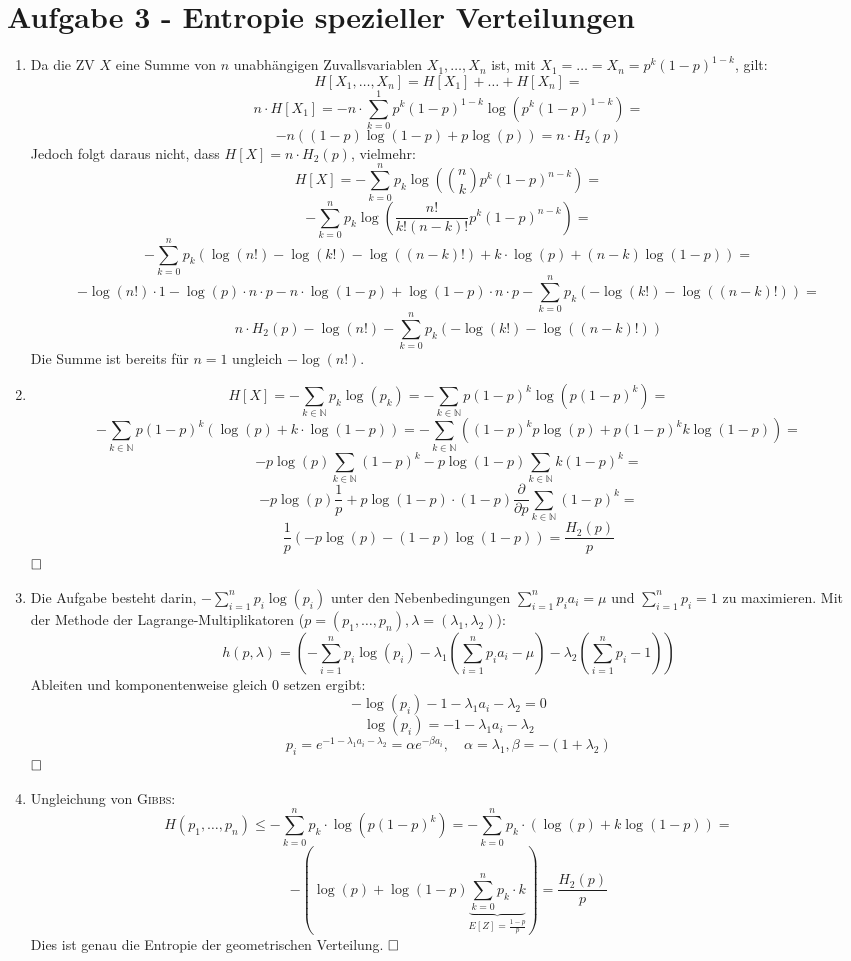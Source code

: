 \section*{Aufgabe 3 - Entropie spezieller Verteilungen}
\begin{enumerate}
	\item
		Da die ZV $X$ eine Summe von $n$ unabhängigen Zuvallsvariablen
		$X_1, \dots, X_n$ ist, mit $X_1 = \dots = X_n = p^k(1-p)^{1-k}$, gilt:
		\[ H[X_1, \dots, X_n] = H[X_1] + \dots + H[X_n] =  \] 
		\[ n \cdot H[X_1] = - n \cdot \sum_{k=0}^1 p^k(1-p)^{1-k} \log(p^k(1-p)^{1-k}) = \]
		\[ - n ((1-p) \log(1-p) + p \log(p)) = n \cdot H_2(p) \]
		Jedoch folgt daraus nicht, dass $H[X] = n \cdot H_2(p)$, vielmehr:
		\[ H[X] = -\sum_{k=0}^n p_k \log(\binom{n}{k} p^k (1-p)^{n-k}) = \]
		\[ -\sum_{k=0}^n p_k \log(\frac{n!}{k!(n-k)!} p^k (1-p)^{n-k}) = \]
		\[ -\sum_{k=0}^n p_k (\log(n!) - \log(k!) - \log((n-k)!) + k \cdot \log(p) + (n-k) \log(1-p)) = \]
		\[ -\log(n!) \cdot 1 -\log(p) \cdot n \cdot p - n \cdot \log(1-p) +
		   \log(1-p) \cdot n \cdot p -\sum_{k=0}^n p_k (-\log(k!) - \log((n-k)!)) = \]
		\[ n\cdot H_2(p) - \log(n!) - \sum_{k=0}^n p_k (-\log(k!) - \log((n-k)!)) \]
		Die Summe ist bereits für $n = 1$ ungleich $-\log(n!)$.
	\item
		\[ H[X] = -\sum_{k\in\mathds{N}} p_k \log(p_k) = -\sum_{k\in\mathds{N}} p(1-p)^k \log(p(1-p)^k) = \]
		\[ -\sum_{k\in\mathds{N}} p(1-p)^k(\log(p) + k \cdot \log(1-p))
		   = -\sum_{k\in\mathds{N}} ((1-p)^kp\log(p) + p(1-p)^kk\log(1-p)) = \]
		\[ -p\log(p)\sum_{k\in\mathds{N}}(1-p)^k - p\log(1-p)\sum_{k\in\mathds{N}}k(1-p)^k = \]
		\[ -p\log(p)\frac{1}{p} + p\log(1-p)\cdot(1-p)\frac{\partial}{\partial p}\sum_{k\in\mathds{N}}(1-p)^k = \]
		\[ \frac{1}{p}(-p\log(p)-(1-p)\log(1-p)) = \frac{H_2(p)}{p} \] $\hfill \square$
	\item
		Die Aufgabe besteht darin, $-\sum_{i=1}^n p_i \log(p_i)$ unter
		den Nebenbedingungen $\sum_{i=1}^n p_i a_i = \mu$ und $\sum_{i=1}^n p_i = 1$ zu
		maximieren. Mit der Methode der Lagrange-Multiplikatoren ($p =
		(p_1, \dots, p_n), \lambda = (\lambda_1, \lambda_2)$):
		\[ h(p, \lambda) = (-\sum_{i=1}^n p_i \log(p_i) - \lambda_1
		   (\sum_{i=1}^n p_i a_i - \mu) - \lambda_2 (\sum_{i=1}^n p_i - 1)) \]
		Ableiten und komponentenweise gleich $0$ setzen ergibt:
		\[ -\log(p_i) - 1 - \lambda_1 a_i - \lambda_2 = 0 \]
		\[ \log(p_i) = -1 - \lambda_1 a_i - \lambda_2 \]
		\[ p_i = e^{-1-\lambda_1 a_i - \lambda_2} = \alpha e^{-\beta
		   a_i}, \quad \alpha = \lambda_1, \beta = -(1+\lambda_2) \] $\hfill \square$
	\item
		Ungleichung von \textsc{Gibbs}:
		\[ H(p_1, \dots, p_n) \leq -\sum_{k=0}^n p_k \cdot
		   \log(p(1-p)^k) = -\sum_{k=0}^n p_k \cdot (\log(p) + k\log(1-p)) = \]
		\[ - \left(\log(p) + \log(1-p) \underbrace{\sum_{k=0}^n p_k \cdot
		   k}_{E[Z] = \frac{1-p}{p}}\right) = \frac{H_2(p)}{p} \]
		Dies ist genau die Entropie der geometrischen Verteilung. $\hfill \square$
\end{enumerate}
